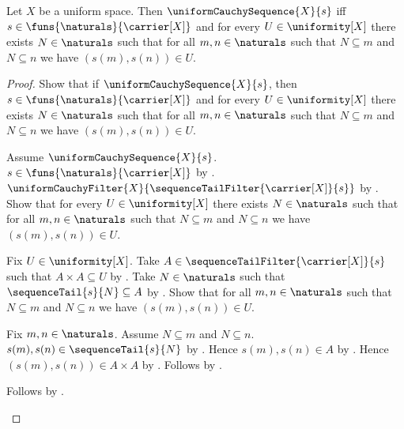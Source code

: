 \begin{theorem}\label{uniform_cauchy_sequence_iff_entourages}
    Let $X$ be a uniform space.
    Then $\uniformCauchySequence{X}{s}$ iff
        $s\in\funs{\naturals}{\carrier[X]}$ and for every
            $U\in\uniformity[X]$ there exists $N\in\naturals$ such that for
            all $m,n\in\naturals$ such that $N\subseteq m$ and
            $N\subseteq n$ we have $(s(m),s(n))\in U$.
\end{theorem}
\begin{proof}
    Show that if $\uniformCauchySequence{X}{s}$, then
        $s\in\funs{\naturals}{\carrier[X]}$ and for every
            $U\in\uniformity[X]$ there exists $N\in\naturals$ such that for
            all $m,n\in\naturals$ such that $N\subseteq m$ and
            $N\subseteq n$ we have $(s(m),s(n))\in U$.
    \begin{subproof}
        Assume $\uniformCauchySequence{X}{s}$.
        $s\in\funs{\naturals}{\carrier[X]}$ by
            .
        $\uniformCauchyFilter{X}
            {\sequenceTailFilter{\carrier[X]}{s}}$
            by .
        Show that for every $U\in\uniformity[X]$ there exists
            $N\in\naturals$ such that for all $m,n\in\naturals$ such that
            $N\subseteq m$ and $N\subseteq n$ we have $(s(m),s(n))\in U$.
        \begin{subproof}
            Fix $U\in\uniformity[X]$.
            Take $A\in\sequenceTailFilter{\carrier[X]}{s}$ such that
                $A\times A\subseteq U$
                by .
            Take $N\in\naturals$ such that $\sequenceTail{s}{N}\subseteq A$
                by .
            Show that for all $m,n\in\naturals$ such that $N\subseteq m$ and
                $N\subseteq n$ we have $(s(m),s(n))\in U$.
            \begin{subproof}
                Fix $m,n\in\naturals$.
                Assume $N\subseteq m$ and $N\subseteq n$.
                $s(m),s(n)\in\sequenceTail{s}{N}$
                    by .
                Hence $s(m),s(n)\in A$ by .
                Hence $(s(m),s(n))\in A\times A$
                    by .
                Follows by .
            \end{subproof}
            Follows by \auto.
        \end{subproof}
    \end{subproof}


\end{proof}
